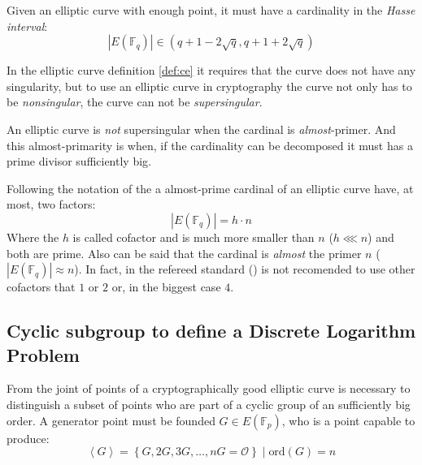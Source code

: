 \documentclass[10pt,a4paper,twoside]{llncs}
\newcommand{\EFp}{\ensuremath{E(\mathbb{F}_p)}}%
\newcommand{\EFq}{\ensuremath{E(\mathbb{F}_q)}}%
\begin{document}

\begin{definition}\label{def:Hasse}
 Given an elliptic curve with enough point, it must have a cardinality in the \emph{Hasse interval}:
\begin{equation}\label{eq:hasse}
| \EFq | \in \left( q+1-2\sqrt{q} , q+1+2\sqrt{q} \right)
\end{equation}
\end{definition}


In the elliptic curve definition \ref{def:ce} it requires that the curve does not have any singularity, but to use an elliptic curve in cryptography the curve not only has to be \emph{nonsingular}, the curve can not be \emph{supersingular}.

\begin{definition}\label{def:nonsupersing}
 An elliptic curve is \emph{not} supersingular when the cardinal is \emph{almost}-primer. And this almost-primarity is when, if the cardinality can be decomposed it must has a prime divisor sufficiently big.
\end{definition}

Following the notation of the \cite{P1363} a almost-prime cardinal of an elliptic curve have, at most, two factors:
\begin{equation}\label{amostprime}
| \EFq | = h \cdot n
\end{equation}
Where the $h$ is called cofactor and is much more smaller than $n$ ($h \lll n$) and both are prime. Also can be said that the cardinal is \emph{almost} the primer $n$ ($|\EFq| \approx n$). In fact, in the refereed standard (\cite{P1363}) is not recomended to use other cofactors that $1$ or $2$ or, in the biggest case $4$.

\subsection{Cyclic subgroup to define a Discrete Logarithm Problem \label{sec:ecdlp}}

From the joint of points of a cryptographically good elliptic curve is necessary to distinguish a subset of points who are part of a cyclic group of an sufficiently big order. A generator point must be founded $G \in \EFp$, who is a point capable to produce:
\begin{equation}\label{eq:sgc}
\left\langle G\right\rangle = \left\{ G,2G,3G,\dots,nG=\mathcal{O}\right\} \; \vert \; \text{ord}(G) = n
\end{equation}
\end{document}
